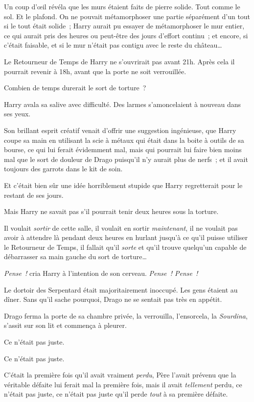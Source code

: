 Un coup d'œil révéla que les murs étaient faits de pierre solide. Tout comme le sol. Et le plafond. On ne pouvait métamorphoser une partie séparément d'un tout si le tout était solide~; Harry aurait pu essayer de métamorphoser le mur entier, ce qui aurait pris des heures ou peut-être des jours d'effort continu~; et encore, si c'était faisable, et si le mur n'était pas contigu avec le reste du château…

Le Retourneur de Temps de Harry ne s'ouvrirait pas avant 21h. Après cela il pourrait revenir à 18h, avant que la porte ne soit verrouillée.

Combien de temps durerait le sort de torture~?

Harry avala sa salive avec difficulté. Des larmes s'amoncelaient à nouveau dans ses yeux.

Son brillant esprit créatif venait d'offrir une suggestion ingénieuse, que Harry coupe sa main en utilisant la scie à métaux qui était dans la boite à outils de sa bourse, ce qui lui ferait évidemment mal, mais qui pourrait lui faire bien moins mal que le sort de douleur de Drago puisqu'il n'y aurait plus de nerfs~; et il avait toujours des garrots dans le kit de soin.

Et c'était bien sûr une idée horriblement stupide que Harry regretterait pour le restant de ses jours.

Mais Harry ne savait pas s'il pourrait tenir deux heures sous la torture.

Il voulait \emph{sortir} de cette salle, il voulait en sortir \emph{maintenant}, il ne voulait pas avoir à attendre là pendant deux heures en hurlant jusqu'à ce qu'il puisse utiliser le Retourneur de Temps, il fallait qu'il \emph{sorte} et qu'il trouve quelqu'un capable de débarrasser sa main gauche du sort de torture…

\emph{Pense~!} cria Harry à l'intention de son cerveau. \emph{Pense~! Pense~!}

\later

Le dortoir des Serpentard était majoritairement inoccupé. Les gens étaient au dîner. Sans qu'il sache pourquoi, Drago ne se sentait pas très en appétit.

Drago ferma la porte de sa chambre privée, la verrouilla, l'ensorcela, la \emph{Sourdina}, s'assit sur son lit et commença à pleurer.

Ce n'était pas juste.

Ce n'était pas juste.

C'était la première fois qu'il avait vraiment \emph{perdu}, Père l'avait prévenu que la véritable défaite lui ferait mal la première fois, mais il avait \emph{tellement} perdu, ce n'était pas juste, ce n'était pas juste qu'il perde \emph{tout} à sa première défaite.

